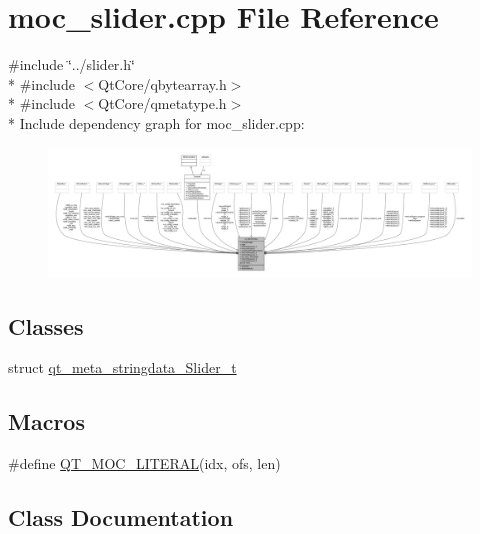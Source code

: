 \hypertarget{a00070}{\section{moc\+\_\+slider.\+cpp File Reference}
\label{a00070}
}
{\ttfamily \#include \char`\"{}../slider.\+h\char`\"{}}\\*
{\ttfamily \#include $<$Qt\+Core/qbytearray.\+h$>$}\\*
{\ttfamily \#include $<$Qt\+Core/qmetatype.\+h$>$}\\*
Include dependency graph for moc\+\_\+slider.\+cpp\+:
\nopagebreak
\begin{figure}[H]
\begin{center}
\leavevmode
\includegraphics[width=350pt]{d4/d6f/a00315}
\end{center}
\end{figure}
\subsection*{Classes}
\begin{DoxyCompactItemize}
\item 
struct \hyperlink{a00070_d3/dd1/a00214}{qt\+\_\+meta\+\_\+stringdata\+\_\+\+Slider\+\_\+t}
\end{DoxyCompactItemize}
\subsection*{Macros}
\begin{DoxyCompactItemize}
\item 
\#define \hyperlink{a00070_a75bb9482d242cde0a06c9dbdc6b83abe}{Q\+T\+\_\+\+M\+O\+C\+\_\+\+L\+I\+T\+E\+R\+A\+L}(idx, ofs, len)
\end{DoxyCompactItemize}


\subsection{Class Documentation}
\label{d3/dd1/a00214}
\hypertarget{a00070_d3/dd1/a00214}{}
